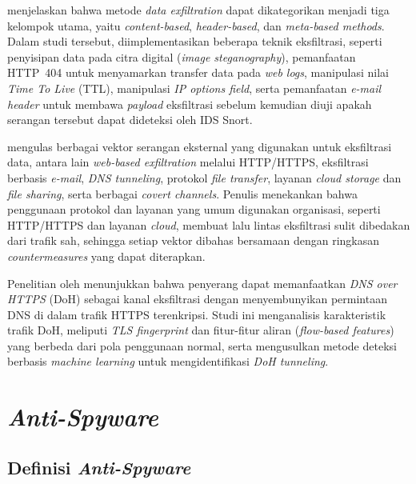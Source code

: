 \textcite{king2021dataexfiltration} menjelaskan bahwa metode \textit{data exfiltration} 
dapat dikategorikan menjadi tiga kelompok utama, yaitu 
\textit{content-based}, \textit{header-based}, dan \textit{meta-based 
methods}. Dalam studi tersebut, diimplementasikan beberapa teknik 
eksfiltrasi, seperti penyisipan data pada citra digital (\textit{image 
steganography}), pemanfaatan HTTP~404 untuk menyamarkan transfer data 
pada \textit{web logs}, manipulasi nilai \textit{Time To Live} (TTL), 
manipulasi \textit{IP options field}, serta pemanfaatan \textit{e-mail 
header} untuk membawa \textit{payload} eksfiltrasi sebelum kemudian diuji 
apakah serangan tersebut dapat dideteksi oleh IDS Snort.

\textcite{ullah2018dataexfiltration} mengulas berbagai vektor serangan eksternal yang 
digunakan untuk eksfiltrasi data, antara lain \textit{web-based 
exfiltration} melalui HTTP/HTTPS, eksfiltrasi berbasis \textit{e-mail}, 
\textit{DNS tunneling}, protokol \textit{file transfer}, layanan 
\textit{cloud storage} dan \textit{file sharing}, serta berbagai 
\textit{covert channels}. Penulis menekankan bahwa penggunaan protokol 
dan layanan yang umum digunakan organisasi, seperti HTTP/HTTPS dan layanan 
\textit{cloud}, membuat lalu lintas eksfiltrasi sulit dibedakan dari trafik 
sah, sehingga setiap vektor dibahas bersamaan dengan ringkasan 
\textit{countermeasures} yang dapat diterapkan.

Penelitian oleh \textcite{zhan2022doh} menunjukkan bahwa penyerang dapat 
memanfaatkan \textit{DNS over HTTPS} (DoH) sebagai kanal eksfiltrasi 
dengan menyembunyikan permintaan DNS di dalam trafik HTTPS terenkripsi. 
Studi ini menganalisis karakteristik trafik DoH, meliputi \textit{TLS 
fingerprint} dan fitur-fitur aliran (\textit{flow-based features}) yang 
berbeda dari pola penggunaan normal, serta mengusulkan metode deteksi 
berbasis \textit{machine learning} untuk mengidentifikasi \textit{DoH 
tunneling}.

\section{\textit{Anti-Spyware}}
\subsection{Definisi \textit{Anti-Spyware}}

